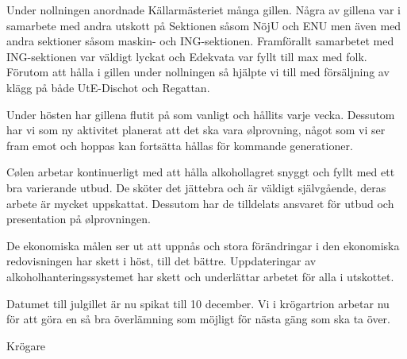 \documentclass[../_main/handlingar.tex]{subfiles}
\begin{document}

Under nollningen anordnade Källarmästeriet många gillen. Några av gillena var i samarbete med andra utskott på Sektionen såsom NöjU och ENU men även med andra sektioner såsom maskin- och ING-sektionen. Framförallt samarbetet med ING-sektionen var väldigt lyckat och Edekvata var fyllt till max med folk. Förutom att hålla i gillen under nollningen så hjälpte vi till med försäljning av klägg på både UtE-Dischot och Regattan.

Under hösten har gillena flutit på som vanligt och hållits varje vecka. Dessutom har vi som ny aktivitet planerat att det ska vara ølprovning, något som vi ser fram emot och hoppas kan fortsätta hållas för kommande generationer.

Cølen arbetar kontinuerligt med att hålla alkohollagret snyggt och fyllt med ett bra varierande utbud. De sköter det jättebra och är väldigt självgående, deras arbete är mycket uppskattat. Dessutom har de tilldelats ansvaret för utbud och presentation på ølprovningen.

De ekonomiska målen ser ut att uppnås och stora förändringar i den ekonomiska redovisningen har skett i höst, till det bättre. Uppdateringar av alkoholhanteringssystemet har skett och underlättar arbetet för alla i utskottet.

Datumet till julgillet är nu spikat till 10 december. Vi i krögartrion arbetar nu för att göra en så bra överlämning som möjligt för nästa gäng som ska ta över.

\begin{signatures}{1}
    \mvh
    \signature{Malin Lindström}{Krögare}
\end{signatures}
\end{document}
